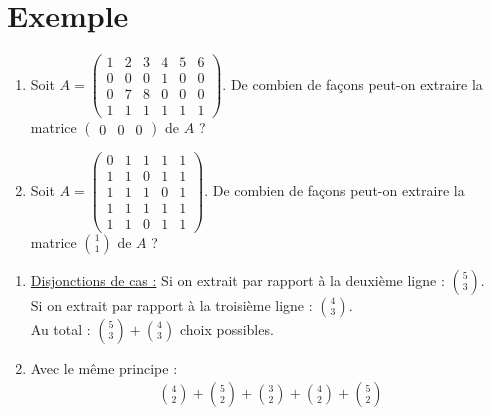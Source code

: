 \documentclass[../main.tex]{subfiles}
\begin{document}
\section{Exemple}
\begin{tcolorbox}[title=Exemple 31.48, title filled=false, colframe=darkgreen, colback=darkgreen!10!white]
    \begin{enumerate}
        \item Soit $A = \begin{pmatrix}
            1 & 2 & 3 & 4 & 5 & 6 \\
            0 & 0 & 0 & 1 & 0 & 0 \\
            0 & 7 & 8 & 0 & 0 & 0 \\
            1 & 1 & 1 & 1 & 1 & 1
        \end{pmatrix}$. De combien de façons peut-on extraire la matrice $\begin{pmatrix}
            0 & 0 & 0
        \end{pmatrix}$ de $A$ ?
        \item Soit $A = \begin{pmatrix}
            0 & 1 & 1 & 1 & 1 \\
            1 & 1 & 0 & 1 & 1 \\
            1 & 1 & 1 & 0 & 1 \\
            1 & 1 & 1 & 1 & 1 \\
            1 & 1 & 0 & 1 & 1
        \end{pmatrix}$. De combien de façons peut-on extraire la matrice $\binom{1}{1}$ de $A$ ?
    \end{enumerate}
\end{tcolorbox}

\begin{enumerate}
    \item \underline{Disjonctions de cas :}
    Si on extrait par rapport à la deuxième ligne : $\binom{5}{3}$. \\
    Si on extrait par rapport à la troisième ligne : $\binom{4}{3}$. \\
    Au total : $\binom{5}{3} + \binom{4}{3}$ choix possibles. 

    \item Avec le même principe : 
    \begin{align*}
        \binom{4}{2} + \binom{5}{2} + \binom{3}{2} + \binom{4}{2} + \binom{5}{2}
    \end{align*}
\end{enumerate}
\end{document}
